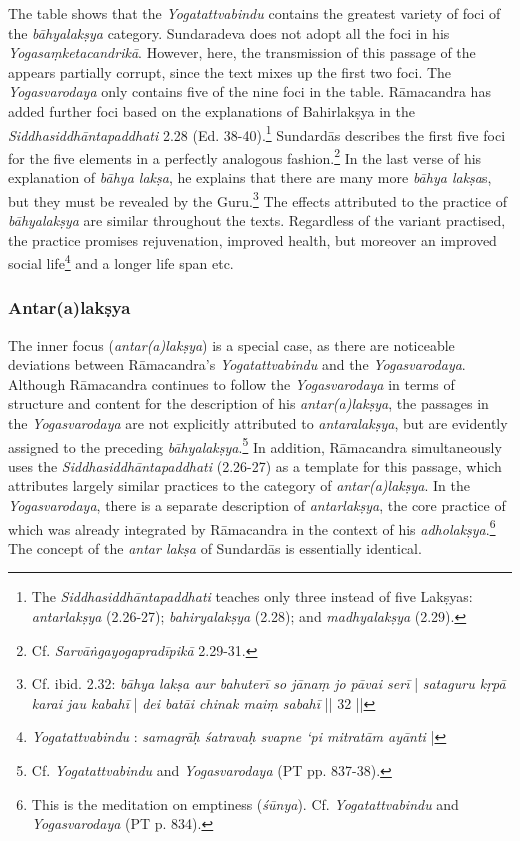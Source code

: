  The table shows that the \textit{Yogatattvabindu} contains the greatest variety of foci of the \textit{bāhyalakṣya} category. Sundaradeva does not adopt all the foci in his \textit{Yogasaṃketacandrikā}. However, here, the transmission of this passage of the appears partially corrupt, since the text mixes up the first two foci. The \textit{Yogasvarodaya} only contains five of the nine foci in the table. Rāmacandra has added further foci based on the explanations of Bahirlakṣya in the \textit{Siddhasiddhāntapaddhati} 2.28 (Ed. 38-40).\footnote{The \textit{Siddhasiddhāntapaddhati} teaches only three instead of five Lakṣyas: \textit{antarlakṣya} (2.26-27); \textit{bahiryalakṣya} (2.28); and \textit{madhyalakṣya} (2.29).} Sundardās describes the first five foci for the five elements in a perfectly analogous fashion.\footnote{Cf. \textit{Sarvāṅgayogapradīpikā} 2.29-31.} In the last verse of his explanation of \textit{bāhya lakṣa}, he explains that there are many more \textit{bāhya lakṣa}s, but they must be revealed by the Guru.\footnote{Cf. ibid. 2.32: \textit{bāhya lakṣa aur bahuterī} \textit{so jānaṃ jo pāvai serī} | \textit{sataguru kṛpā karai jau kabahī} | \textit{dei batāi chinak maiṃ sabahī} || 32 ||}
The effects attributed to the practice of \textit{bāhyalakṣya} are similar throughout the texts. Regardless of the variant practised, the practice promises rejuvenation, improved health, but moreover an improved social life\footnote{\textit{Yogatattvabindu} : \textit{samagrāḥ śatravaḥ svapne ‘pi mitratām ayānti} |} and a longer life span etc. 

\subsubsection{Antar(a)lakṣya}
\label{antaralaksya}
The inner focus (\textit{antar(a)lakṣya}) is a special case, as there are noticeable deviations between Rāmacandra’s \textit{Yogatattvabindu} and the \textit{Yogasvarodaya}. Although Rāmacandra continues to follow the \textit{Yogasvarodaya} in terms of structure and content for the description of his \textit{antar(a)lakṣya}, the passages in the \textit{Yogasvarodaya} are not explicitly attributed to \textit{antaralakṣya}, but are evidently assigned to the preceding \textit{bāhyalakṣya}.\footnote{Cf. \textit{Yogatattvabindu}  and \textit{Yogasvarodaya} (PT pp. 837-38).} In addition, Rāmacandra simultaneously uses the \textit{Siddhasiddhāntapaddhati} (2.26-27) as a template for this passage, which attributes largely similar practices to the category of \textit{antar(a)lakṣya}. In the \textit{Yogasvarodaya}, there is a separate description of \textit{antarlakṣya}, the core practice of which was already integrated by Rāmacandra in the context of his \textit{adholakṣya}.\footnote{This is the meditation on emptiness (\textit{śūnya}). Cf. \textit{Yogatattvabindu}  and \textit{Yogasvarodaya} (PT p. 834).} 
The concept of the \textit{antar lakṣa} of Sundardās is essentially identical.

